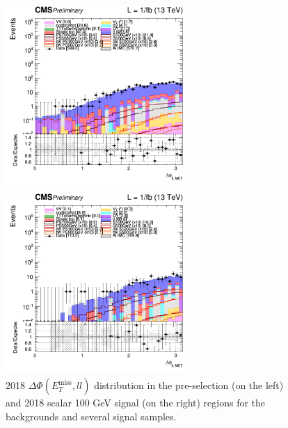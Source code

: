 \documentclass[a4paper, 10pt, openright]{report}
\begin{document}
\begin{itemize}
\begin{figure}[htbp]
\begin{minipage}[c]{.32\linewidth}
{	}
   \end{minipage} \hfill
   \label{fig:scheme_deltaphi}
  \end{figure}
   
\begin{figure}[htbp]
\centering
\begin{minipage}[b]{.48\textwidth}
\includegraphics[width=7cm, height=7cm]{figs/log_cratio_topCR_ll_dphillmet_2018.png}
\end{minipage}\hfill
\begin{minipage}[b]{.48\textwidth}
\includegraphics[width=7cm, height=7cm]{figs/log_cratio_topCR_ll_DNN_signal0_scalar100_dphillmet_2018.png}
\end{minipage} \hfill
\caption{2018 $\Delta \Phi(E_{T}^{\text{miss}}, ll)$ distribution in the pre-selection (on the left) and 2018 scalar 100 GeV signal (on the right) regions for the backgrounds and several signal samples.}
\label{fig:SRdisc4}
\end{figure}


\end{itemize}
\end{document}
